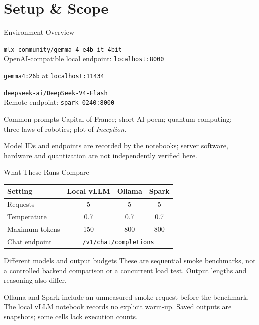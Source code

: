 \documentclass[aspectratio=169,12pt]{beamer}
\begin{document}
\section{Setup \& Scope}
\begin{frame}{Environment Overview}
\small
\begin{description}
\item[Local vLLM] \texttt{mlx-community/gemma-4-e4b-it-4bit}\\
  OpenAI-compatible local endpoint: \texttt{localhost:8000}
\item[Ollama] \texttt{gemma4:26b} at \texttt{localhost:11434}
\item[Spark endpoint] \texttt{deepseek-ai/DeepSeek-V4-Flash}\\
  Remote endpoint: \texttt{spark-0240:8000}
\end{description}
\begin{block}{Common prompts}
Capital of France; short AI poem; quantum computing;\\
three laws of robotics; plot of \emph{Inception}.
\end{block}
\footnotesize Model IDs and endpoints are recorded by the notebooks; server software, hardware and quantization are not independently verified here.
\end{frame}
\begin{frame}{What These Runs Compare}
\begin{tabular}{lccc}
\toprule
Setting & Local vLLM & Ollama & Spark \\
\midrule
Requests & 5 & 5 & 5 \\
Temperature & 0.7 & 0.7 & 0.7 \\
Maximum tokens & 150 & 800 & 800 \\
Chat endpoint & \multicolumn{3}{c}{\texttt{/v1/chat/completions}} \\
\bottomrule
\end{tabular}
\begin{alertblock}{Different models and output budgets}
These are sequential smoke benchmarks, not a controlled backend comparison or a concurrent load test. Output lengths and reasoning also differ.
\end{alertblock}
\small Ollama and Spark include an unmeasured smoke request before the benchmark. The local vLLM notebook records no explicit warm-up. Saved outputs are snapshots; some cells lack execution counts.
\end{frame}
\end{document}
